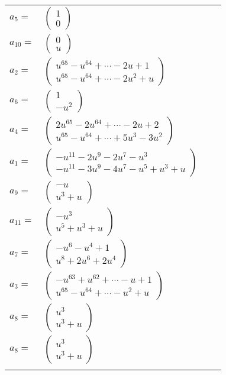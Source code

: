 \documentclass[1p]{elsarticle_modified}
\theoremstyle{definition}
\begin{document}
\begin{tabular}{m{7pt} m{180pt} m{7pt} m{180pt} }
\flushright $a_{5}=$&$\begin{pmatrix}1\\0\end{pmatrix}$ \\
\flushright $a_{10}=$&$\begin{pmatrix}0\\u\end{pmatrix}$ \\
\flushright $a_{2}=$&$\begin{pmatrix}u^{65}- u^{64}+\cdots-2 u+1\\u^{65}- u^{64}+\cdots-2 u^2+u\end{pmatrix}$ \\
\flushright $a_{6}=$&$\begin{pmatrix}1\\- u^2\end{pmatrix}$ \\
\flushright $a_{4}=$&$\begin{pmatrix}2 u^{65}-2 u^{64}+\cdots-2 u+2\\u^{65}- u^{64}+\cdots+5 u^3-3 u^2\end{pmatrix}$ \\
\flushright $a_{1}=$&$\begin{pmatrix}- u^{11}-2 u^9-2 u^7- u^3\\- u^{11}-3 u^9-4 u^7- u^5+u^3+u\end{pmatrix}$ \\
\flushright $a_{9}=$&$\begin{pmatrix}- u\\u^3+u\end{pmatrix}$ \\
\flushright $a_{11}=$&$\begin{pmatrix}- u^3\\u^5+u^3+u\end{pmatrix}$ \\
\flushright $a_{7}=$&$\begin{pmatrix}- u^6- u^4+1\\u^8+2 u^6+2 u^4\end{pmatrix}$ \\
\flushright $a_{3}=$&$\begin{pmatrix}- u^{63}+u^{62}+\cdots- u+1\\u^{65}- u^{64}+\cdots- u^2+u\end{pmatrix}$ \\
\flushright $a_{8}=$&$\begin{pmatrix}u^3\\u^3+u\end{pmatrix}$\\ \flushright $a_{8}=$&$\begin{pmatrix}u^3\\u^3+u\end{pmatrix}$\\&\end{tabular}
\end{document}
